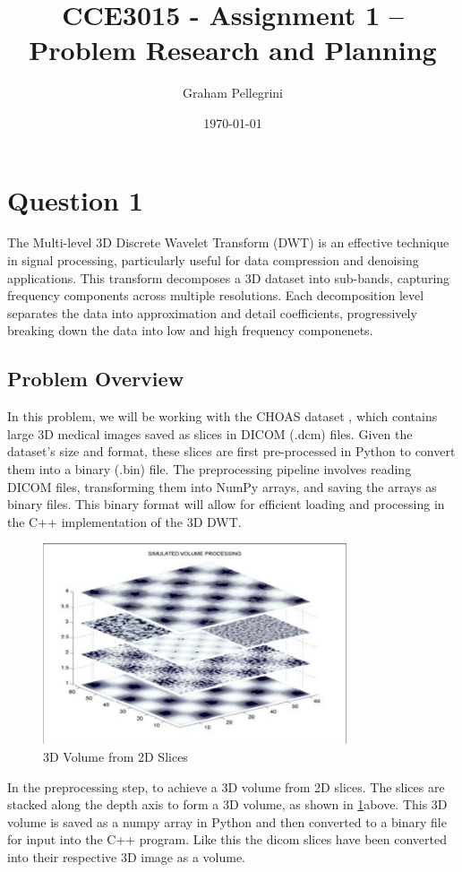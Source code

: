 \documentclass{article}
\title{CCE3015 - Assignment 1 – Problem Research and Planning}
\author{Graham Pellegrini}
\date{\today}
\begin{document}
\maketitle
\section{Question 1}
The Multi-level 3D Discrete Wavelet Transform (DWT) is an effective technique in signal processing, particularly useful for data compression and denoising applications. This transform decomposes a 3D dataset into sub-bands, capturing frequency components across multiple resolutions. Each decomposition level separates the data into approximation and detail coefficients, progressively breaking down the data into low and high frequency componenets.

\subsection{Problem Overview}
In this problem, we will be working with the CHOAS dataset \cite{CHAOSdata2019}, which contains large 3D medical images saved as slices in DICOM (.dcm) files. Given the dataset's size and format, these slices are first pre-processed in Python to convert them into a binary (.bin) file. The preprocessing pipeline involves reading DICOM files, transforming them into NumPy arrays, and saving the arrays as binary files. This binary format will allow for efficient loading and processing in the C++ implementation of the 3D DWT.

\begin{figure}[h]
    \centering
    \includegraphics[width=0.8\textwidth]{assets/slices.png}
    \caption{3D Volume from 2D Slices \cite{Prochazka2011}}
    \label{fig1}
\end{figure}

In the preprocessing step, to achieve a 3D volume from 2D slices. The slices are stacked along the depth axis to form a 3D volume, as shown in \ref{fig1}above. This 3D volume is saved as a numpy array in Python and then converted to a binary file for input into the C++ program. Like this the dicom slices have been converted into their respective 3D image as a volume.\\
\end{document}
